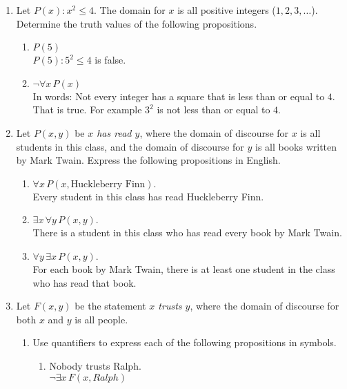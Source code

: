 \documentclass[11pt]{amsart}
\begin{document}
\begin{enumerate}

\item Let $P(x): x^2\leq 4$.  The domain for $x$ is all positive integers ($1,2,3,\ldots$). Determine the truth values of the following propositions. 
\begin{enumerate}
\item $P(5)$\\[3pt]
{\color{blue}
$P(5): 5^2 \leq 4$ is false.
}\\[3pt]
\item$\neg \forall x\, P(x)$\\[3pt]
{\color{blue}
In words: Not every integer has a square that is less than or equal to $4$. That is true.
For example $3^2$ is not less than or equal to $4$.
}\\[5pt] 

\end{enumerate}


\item Let $P(x,y)$ be {\it $x$ has read $y$}, where the domain of discourse for 
$x$ is all students
in this class, and the domain of discourse for $y$ is all books written by Mark Twain. Express the
following propositions in English. 
\begin{enumerate}
\item $\forall x\, P(x,\text{Huckleberry Finn}).$\\[3pt]
{\color{blue}
Every student in this class has read Huckleberry Finn.
}\\[3pt]
\item $\exists x\, \forall y\, P(x,y).$\\[3pt]
{\color{blue}
There is a student in this class who has read every book by Mark Twain.
}\\[3pt]
\item $\forall y\, \exists x\, P(x,y).$\\[3pt]
{\color{blue}
For each book by Mark Twain, there is at least one student in the class who has read that book.
}\\[5pt]
\end{enumerate}

\vfill\break

\item Let $F(x,y)$ be the statement {\it $x$ trusts $y$}, where the domain of discourse
for both $x$ and $y$ is  all people. 
\begin{enumerate}
\item
 Use quantifiers to express each of the following propositions in symbols.
\begin{enumerate}
\item Nobody trusts Ralph.\\[3pt]
{\color{blue} $\lnot\exists{x}\,F(x,Ralph)$}\\[3pt]


\end{enumerate}
\end{enumerate}
\end{enumerate}
\end{document}
